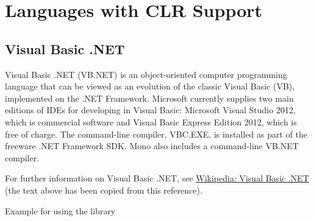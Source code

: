%
%
%
%
%
%
%
%



\chapter{Languages with CLR Support}
\label{Languages with CLR Support}

\section{Visual Basic .NET}

Visual Basic .NET (VB.NET) is an object-oriented computer programming language that can be viewed as an evolution of the classic Visual Basic (VB), implemented on the .NET Framework. Microsoft currently supplies two main editions of IDEs for developing in Visual Basic: Microsoft Visual Studio 2012, which is commercial software and Visual Basic Express Edition 2012, which is free of charge. The command-line compiler, VBC.EXE, is installed as part of the freeware .NET Framework SDK. Mono also includes a command-line VB.NET compiler. 

\vpara
For further information on Visual Basic .NET, see \href{http://en.wikipedia.org/wiki/Visual_Basic_.NET}{Wikipedia: Visual Basic .NET} (the text above has been copied from this reference).


\vpara
Example for using the library


